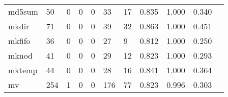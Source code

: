 \begin{longtable}{lp{1.20cm}p{1.20cm}p{1.20cm}p{1.20cm}p{1.20cm}p{1.20cm}p{1.20cm}p{1.20cm}p{1.20cm}p{1.20cm}}
md5sum    &                                    50 &                                                  0 &                                                  0 &                                                  0 &                                                 33 &                                                 17 &                                         0.835 &                                              1.000 &                                              0.340 \\
mkdir     &                                    71 &                                                  0 &                                                  0 &                                                  0 &                                                 39 &                                                 32 &                                         0.863 &                                              1.000 &                                              0.451 \\
mkfifo    &                                    36 &                                                  0 &                                                  0 &                                                  0 &                                                 27 &                                                  9 &                                         0.812 &                                              1.000 &                                              0.250 \\
mknod     &                                    41 &                                                  0 &                                                  0 &                                                  0 &                                                 29 &                                                 12 &                                         0.823 &                                              1.000 &                                              0.293 \\
mktemp    &                                    44 &                                                  0 &                                                  0 &                                                  0 &                                                 28 &                                                 16 &                                         0.841 &                                              1.000 &                                              0.364 \\
mv        &                                   254 &                                                  1 &                                                  0 &                                                  0 &                                                176 &                                                 77 &                                         0.823 &                                              0.996 &                                              0.303 \\

\end{longtable}
